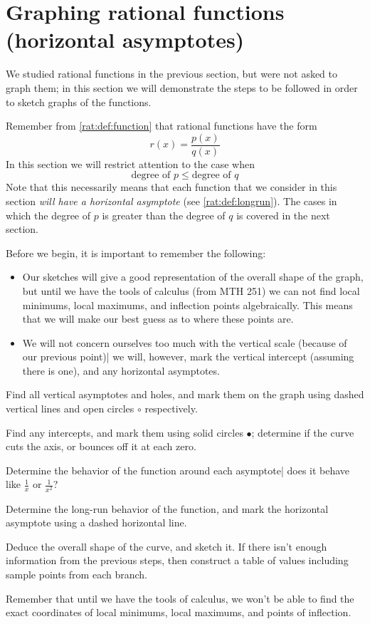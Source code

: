 \section{Graphing rational functions (horizontal asymptotes)}
We studied rational functions in the previous section, but were 
not asked to graph them; in this section we will demonstrate the 
steps to be followed in order to sketch graphs of the functions. 

Remember from \vref{rat:def:function} that rational functions have 
the form
\[
	r(x)=\frac{p(x)}{q(x)}
\]
In this section we will restrict attention to the case when 
\[
	\text{degree of }p\leq \text{degree of }q
\]
Note that this necessarily means that each function that we consider
in this section \emph{will have a horizontal asymptote} (see \vref{rat:def:longrun}).
The cases in which the degree of $p$ is greater than the degree of $q$ 
is covered in the next section.

Before we begin, it is important to remember the following:
\begin{itemize}
	\item Our sketches will give a good representation of the overall 
	shape of the graph, but until we have the tools of calculus (from MTH 251)
	we can not find local minimums, local maximums, and inflection points algebraically. This
	means that we will make our best guess as to where these points are.
	\item We will not concern ourselves too much with the vertical scale (because of 
	our previous point)| we will, however, mark the vertical intercept (assuming there is one), 
	and any horizontal asymptotes.
\end{itemize}
\begin{pccspecialcomment}\label{rat:def:stepsforsketch}
	\begin{steps}
		\item \label{rat:step:first} Find all vertical asymptotes and holes, and mark them on the 
		graph using dashed vertical lines and open circles $\circ$ respectively.
		\item Find any intercepts, and mark them using solid circles $\bullet$;
		determine if the curve cuts the axis, or bounces off it at each zero.
		\item Determine the behavior of the function around each asymptote| does
		it behave like $\frac{1}{x}$ or $\frac{1}{x^2}$?
		\item \label{rat:step:penultimate} Determine the long-run behavior of the function, and mark the horizontal 
		asymptote using a dashed horizontal line.
		\item \label{rat:step:last}  Deduce the overall shape of the curve, and sketch it. If there isn't
		enough information from the previous steps, then construct a table of values
		including sample points from each branch.
	\end{steps}
	Remember that until we have the tools of calculus, we won't be able to 
	find the exact coordinates of local minimums, local maximums, and points
	of inflection.
\end{pccspecialcomment}

